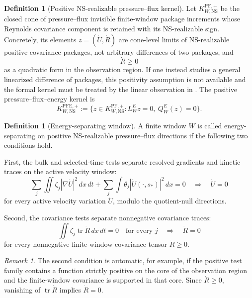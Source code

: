 \documentclass[11pt]{article}
\numberwithin{equation}{section}
\theoremstyle{plain}
\theoremstyle{definition}
\newtheorem{definition}[theorem]{Definition}
\theoremstyle{remark}
\newtheorem{remark}[theorem]{Remark}
\newcommand{\NS}{\mathrm{NS}}
\newcommand{\PF}{\mathrm{PF}}
\newcommand{\PFE}{\mathrm{PFE}}
\newcommand{\tr}{\operatorname{tr}}
\begin{document}
\begin{definition}[Positive NS-realizable pressure--flux kernel]
\label{def:positive-ns-pf-kernel}
Let \(K^{\PF,+}_{W,\NS}\) be the closed cone of pressure--flux invisible finite-window package increments whose Reynolds covariance component is retained with its NS-realizable sign.  Concretely, its elements \(z=(\dot U,\dot R)\) are cone-level limits of NS-realizable positive covariance packages, not arbitrary differences of two packages, and
\[
        \dot R\ge0
\]
as a quadratic form in the observation region.  If one instead studies a general linearized difference of packages, this positivity assumption is not available and the formal kernel must be treated by the linear observation in .  The positive pressure--flux--energy kernel is
\begin{equation}
        K^{\PFE,+}_{W,\NS}
        :=
        \{z\in K^{\PF,+}_{W,\NS}:L^E_Wz=0,\ Q^E_W(z)=0\}.
        \label{eq:positive-pfe-kernel}
\end{equation}
\end{definition}

\begin{definition}[Energy-separating window]
\label{def:energy-separating-window}
A finite window \(W\) is called energy-separating on positive NS-realizable pressure--flux directions if the following two conditions hold.

First, the bulk and selected-time tests separate resolved gradients and kinetic traces on the active velocity window:
\[
        \sum_j\iint\zeta_j|\nabla\dot U|^2\,dx\,dt
        +
        \sum_j\int\theta_j|\dot U(\cdot,s_*)|^2\,dx
        =0
        \quad\Longrightarrow\quad
        \dot U=0
\]
for every active velocity variation \(\dot U\), modulo the quotient-null directions.

Second, the covariance tests separate nonnegative covariance traces:
\[
        \iint\zeta_j\tr\dot R\,dx\,dt=0
        \quad\text{for every }j
        \quad\Longrightarrow\quad
        \dot R=0
\]
for every nonnegative finite-window covariance tensor \(\dot R\ge0\).
\end{definition}

\begin{remark}
The second condition is automatic, for example, if the positive test family contains a function strictly positive on the core of the observation region and the finite-window covariance is supported in that core.  Since \(\dot R\ge0\), vanishing of \(\tr\dot R\) implies \(\dot R=0\).
\end{remark}
\end{document}
